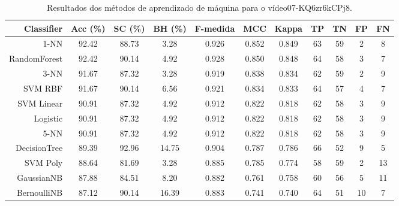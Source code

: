 \begin{table}[!htb]
\centering
\caption{Resultados dos métodos de aprendizado de máquina para o vídeo07-KQ6zr6kCPj8.}
\label{tab:07-KQ6zr6kCPj8}
\begin{tabular}{r|c|c|c|c|c|c|c|c|c|c}
\hline\hline
Classifier & Acc (\%) & SC (\%) & BH (\%) & F-medida & MCC & Kappa & TP & TN & FP & FN \\ \hline
1-NN & 92.42 & 88.73 & 3.28 & 0.926 & 0.852 & 0.849 & 63 & 59 & 2 & 8 \\ 
RandomForest & 92.42 & 90.14 & 4.92 & 0.928 & 0.850 & 0.848 & 64 & 58 & 3 & 7 \\ 
3-NN & 91.67 & 87.32 & 3.28 & 0.919 & 0.838 & 0.834 & 62 & 59 & 2 & 9 \\ 
SVM RBF & 91.67 & 90.14 & 6.56 & 0.921 & 0.834 & 0.833 & 64 & 57 & 4 & 7 \\ 
SVM Linear & 90.91 & 87.32 & 4.92 & 0.912 & 0.822 & 0.818 & 62 & 58 & 3 & 9 \\ 
Logistic & 90.91 & 87.32 & 4.92 & 0.912 & 0.822 & 0.818 & 62 & 58 & 3 & 9 \\ 
5-NN & 90.91 & 87.32 & 4.92 & 0.912 & 0.822 & 0.818 & 62 & 58 & 3 & 9 \\ 
DecisionTree & 89.39 & 92.96 & 14.75 & 0.904 & 0.787 & 0.786 & 66 & 52 & 9 & 5 \\ 
SVM Poly & 88.64 & 81.69 & 3.28 & 0.885 & 0.785 & 0.774 & 58 & 59 & 2 & 13 \\ 
GaussianNB & 87.88 & 84.51 & 8.20 & 0.882 & 0.761 & 0.758 & 60 & 56 & 5 & 11 \\ 
BernoulliNB & 87.12 & 90.14 & 16.39 & 0.883 & 0.741 & 0.740 & 64 & 51 & 10 & 7 \\ 
\hline\hline
\end{tabular}
\end{table}

